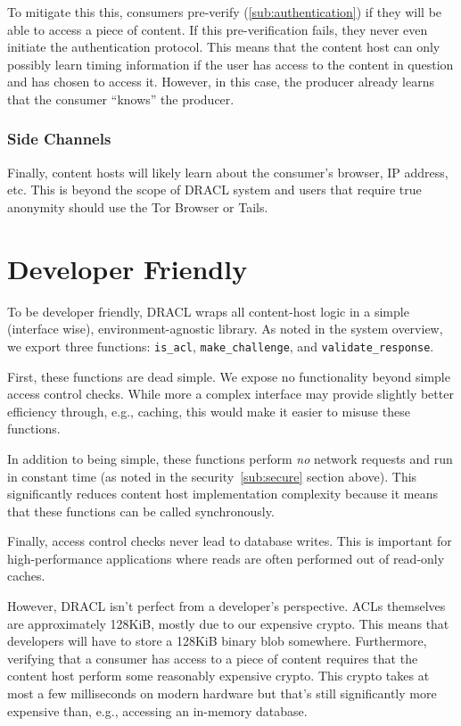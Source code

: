 \documentclass[pdftex,12pt,a4papaer,twoside,notitlepage]{report}
\begin{document}
To mitigate this this, consumers pre-verify (\ref{sub:authentication}) if they
will be able to access a piece of content. If this pre-verification fails, they
never even initiate the authentication protocol. This means that the content
host can only possibly learn timing information if the user has access to the
content in question and has chosen to access it. However, in this case, the
producer already learns that the consumer ``knows'' the producer.

\subsubsection{Side Channels}

Finally, content hosts will likely learn about the consumer's browser, IP
address, etc. This is beyond the scope of DRACL system and users that require
true anonymity should use the Tor Browser\cite{tor} or Tails\cite{tails}.

\section{Developer Friendly}

To be developer friendly, DRACL wraps all content-host logic in a simple
(interface wise), environment-agnostic library. As noted in the system overview,
we export three functions: \verb=is_acl=, \verb=make_challenge=, and
\verb=validate_response=.

First, these functions are dead simple. We expose no functionality beyond simple
access control checks. While more a complex interface may provide slightly better
efficiency through, e.g., caching, this would make it easier to misuse these
functions.

In addition to being simple, these functions perform \emph{no} network requests
and run in constant time (as noted in the security~\ref{sub:secure} section
above). This significantly reduces content host implementation complexity
because it means that these functions can be called synchronously.

Finally, access control checks never lead to database writes. This is important
for high-performance applications where reads are often performed out of
read-only caches.

However, DRACL isn't perfect from a developer's perspective. ACLs themselves are
approximately 128KiB, mostly due to our expensive crypto. This means that
developers will have to store a 128KiB binary blob somewhere. Furthermore,
verifying that a consumer has access to a piece of content requires that the
content host perform some reasonably expensive crypto. This crypto takes at most
a few milliseconds on modern hardware but that's still significantly more
expensive than, e.g., accessing an in-memory database.
\end{document}
